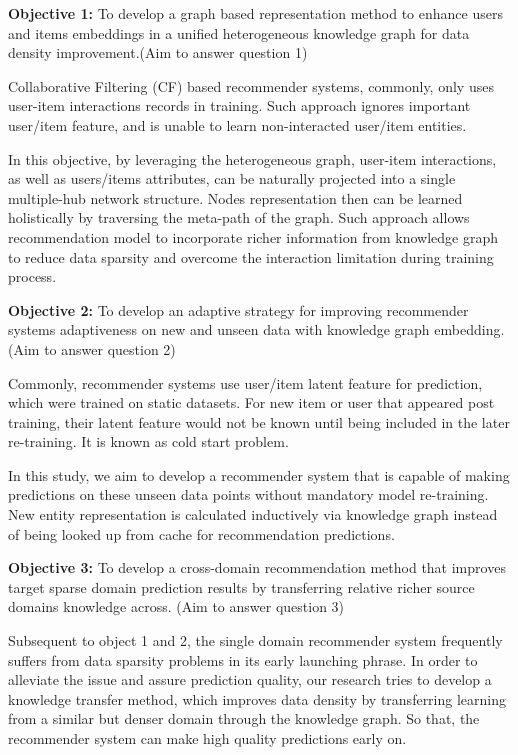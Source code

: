 \bigskip
\textbf{Objective 1:} To develop a graph based representation method to enhance users and items embeddings in a unified heterogeneous knowledge graph for data density improvement.(Aim to answer question 1)

Collaborative Filtering (CF) based recommender systems, commonly, only uses user-item interactions records in training. Such approach ignores important user/item feature, and is unable to learn non-interacted user/item entities. 

In this objective, by leveraging the heterogeneous graph, user-item interactions, as well as users/items attributes, can be naturally projected into a single multiple-hub network \citep{Shi2017} structure. Nodes representation then can be learned holistically by traversing the meta-path of the graph. Such approach allows recommendation model to incorporate richer information from knowledge graph to reduce data sparsity and overcome the interaction limitation during training process.


\bigskip
\textbf{Objective 2:} To develop an adaptive strategy for improving recommender systems adaptiveness on new and unseen data with knowledge graph embedding. (Aim to answer question 2)

Commonly, recommender systems use user/item latent feature for prediction, which were trained on static datasets. For new item or user that appeared post training, their latent feature would not be known until being included in the later re-training. It is known as cold start problem.

In this study, we aim to develop a recommender system that is capable of making predictions on these unseen data points without mandatory model re-training. New entity representation is calculated inductively via knowledge graph instead of being looked up from cache for recommendation predictions.


\bigskip
\textbf{Objective 3:} To develop a cross-domain recommendation method that improves target sparse domain prediction results by transferring relative richer source domains knowledge across. (Aim to answer question 3)

Subsequent to object 1 and 2, the single domain recommender system frequently suffers from data sparsity problems in its early launching phrase. In order to alleviate the issue and assure prediction quality, our research tries to develop a knowledge transfer method, which improves data density by transferring learning from a similar but denser domain through the knowledge graph. So that, the recommender system can make high quality predictions early on.

